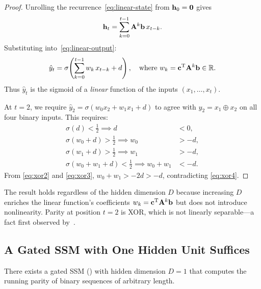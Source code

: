 \documentclass[11pt]{article}
\newcommand\hh{\mathbf{h}}
\newcommand{\sigmoid}{\sigma}
\begin{document}
\begin{proof}
Unrolling the recurrence~\eqref{eq:linear-state} from $\hh_0 = \zeroVec$ gives
\begin{equation}
    \hh_t = \sum_{k=0}^{t-1} \AA^k \bb\, x_{t-k}.
\end{equation}
Substituting into~\eqref{eq:linear-output}:
\begin{equation}
    \hat{y}_t = \sigmoid\!\rb{\sum_{k=0}^{t-1} w_k\, x_{t-k} + d}, \quad \text{where } w_k = \cc^\transpose \AA^k \bb \in \R.
\end{equation}
Thus $\hat{y}_t$ is the sigmoid of a \emph{linear} function of the inputs $(x_1, \ldots, x_t)$.

At $t = 2$, we require $\hat{y}_2 = \sigmoid(w_0 x_2 + w_1 x_1 + d)$ to agree with $y_2 = x_1 \oplus x_2$ on all four binary inputs.
This requires:
\begin{align}
    \sigmoid(d) < \tfrac{1}{2} \implies d &< 0, \label{eq:xor1}\\
    \sigmoid(w_0 + d) > \tfrac{1}{2} \implies w_0 &> -d, \label{eq:xor2}\\
    \sigmoid(w_1 + d) > \tfrac{1}{2} \implies w_1 &> -d, \label{eq:xor3}\\
    \sigmoid(w_0 + w_1 + d) < \tfrac{1}{2} \implies w_0 + w_1 &< -d. \label{eq:xor4}
\end{align}
From \eqref{eq:xor2} and \eqref{eq:xor3}, $w_0 + w_1 > -2d > -d$, contradicting \eqref{eq:xor4}.
\end{proof}

\begin{remark}
The result holds regardless of the hidden dimension $D$ because increasing $D$ enriches the linear function's coefficients $w_k = \mathbf{c}^{\mathrm{T}} \mathbf{A}^k \mathbf{b}$ but does not introduce nonlinearity. Parity at position $t=2$ is XOR, which is not linearly separable---a fact first observed by~\citet{minsky1969perceptrons}.
\end{remark}


\subsection{A Gated SSM with One Hidden Unit Suffices}

\begin{theorem}
\label{thm:gru-sufficient}
There exists a gated SSM () with hidden dimension $D = 1$ that computes the running parity of binary sequences of arbitrary length.
\end{theorem}
\end{document}
